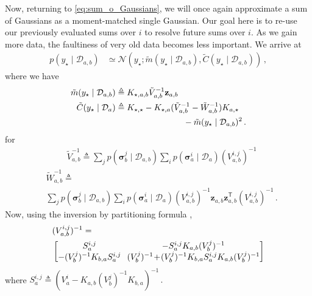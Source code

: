 \documentclass{article}
\newcommand{\given}{\ensuremath{\mid}}
\newcommand{\cm}[1]{\ensuremath{\mathcal{#1}}}
\newcommand{\bm}[1]{\ensuremath{\mathbf{#1}}}
\newcommand{\data}{\ensuremath{\cm{D}}}
\newcommand{\vect}[1]{\bm{#1}}
\newcommand{\vz}{\vect{z}}
\newcommand{\vs}{\vect{\sigma}}
\newcommand{\amean}[2]{\tilde{{m}}(#1 \given #2 )}
\newcommand{\acov}[2]{\tilde{{C}}(#1 \given #2 )}
\newcommand{\p}[2]{p(#1 \given #2 )}
\newcommand{\fPr}{p}
\newcommand{\Prob}[2]{\fPr(#1 \given #2 )}
\newcommand{\N}[3]{\cm{N}( #1;#2,#3 )}
\newcommand{\st}{_{\star}}
\newcommand{\tr}{\ensuremath{\mathsf{T}}}
\newcommand{\defequal}{\triangleq}
\begin{document}
Now, returning to \eqref{eq:sum_o_Gaussians}, we will once again
approximate a sum of Gaussians as a moment-matched single
Gaussian. Our goal here is to re-use our previously evaluated sums
over $i$ to resolve future sums over $i$. As we gain more data, the
faultiness of very old data becomes less important. We arrive at
\begin{align}
\p{y\st}{\data_{a,b}} & \simeq \N{y\st}{\amean{y\st}{\data_{a,b}}}{\acov{y\st}{\data_{a,b}}}\,,\label{eq:pyab}
\end{align}
where we have
\begin{align}
\amean{y\st}{\data_{a,b}} & \defequal  K_{\star,a,b} \tilde{V}_{a,b}^{-1} \vz_{a,b}\label{eq:ameanab}\\
\acov{y\st}{\data_{a}}
& \defequal K_{\star,\star} - K_{\star,a}(\tilde{V}_{a,b}^{-1}-\tilde{W}_{a,b}^{-1})K_{a,\star} \nonumber\\
& \hspace{2.8cm} - \amean{y\st}{\data_{a,b}}^2 \,.\label{eq:acovab}
\end{align}
for
\begin{align*}
 & \tilde{V}^{-1}_{a,b} \defequal 
\sum_{j} \Prob{\vs^j_{b}}{\data_{a,b}}\sum_i \Prob{\vs^i_{a}}{\data_{a}} (V_{a,b}^{i,j})^{-1}
\end{align*}
\begin{align*}
 & \tilde{W}^{-1}_{a,b} \defequal \nonumber\\ 
& \sum_{j} \Prob{\vs^j_{b}}{\data_{a,b}}\sum_i \Prob{\vs^i_{a}}{\data_{a}} (V_{a,b}^{i,j})^{-1}\vz_{a,b}^{\phantom{\tr}} \vz_{a,b}^\tr (V_{a,b}^{i,j})^{-1}\,.
\end{align*}
Now, using the inversion by partitioning formula \citep[Section 2.7]
{NumericalRecipes},
\begin{align*}
\hspace{-0.2cm}&({V}^{i,j}_{a,b})^{-1} = \\
&\begin{bmatrix}
 S^{i,j}_a &\hspace{-0.1cm} -S^{i,j}_a K_{a,b} (V^j_b)^{-1} \\
 - (V^j_b)^{-1} K_{b,a} S^{i,j}_a &\hspace{-0.1cm} (V^j_b)^{-1}\!+\!(V^j_b)^{-1} K_{b,a} S^{i,j}_a K_{a,b} (V^j_b)^{-1} 
\end{bmatrix}
\end{align*}
where
$
S^{i,j}_a \defequal (V^i_a -K_{a,b} (V^j_b)^{-1}K_{b,a})^{-1}\,.
$
\end{document}
